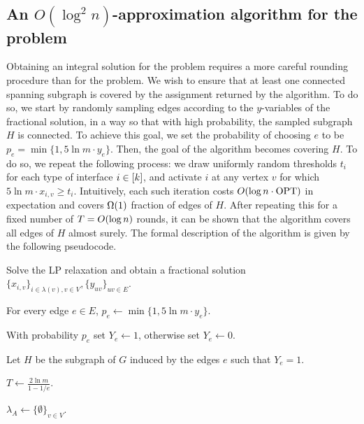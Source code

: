 \subsection{An $O(\log^2 n)$-approximation algorithm for the \connectivity problem}
Obtaining an integral solution for the \connectivity problem requires a more careful rounding procedure than for the \coverage problem. We wish to ensure that at least one connected spanning subgraph is covered by the assignment returned by the algorithm. To do so, we start by randomly sampling edges according to the $y$-variables of the fractional solution, in a way so that with high probability, the sampled subgraph $H$ is connected. To achieve this goal, we set the probability of choosing $e$ to be $p_e=\min\{1, 5\ln m \cdot y_e\}$. Then, the goal of the algorithm becomes covering $H$. To do so, we repeat the following process: we draw uniformly random thresholds $t_i$ for each type of interface $i\in \mathopen{}\left[ k \right]$, and activate $i$ at any vertex $v$ for which $5\ln m \cdot x_{i,v}\geq t_i$. Intuitively, each such iteration costs $O\mathopen{}\left( \log n\cdot \textnormal{OPT} \right)$ in expectation and covers $\Omega\mathopen{}\left( 1 \right)$ fraction of edges of $H$. After repeating this for a fixed number of $T = O\mathopen{}\left( \log n \right)$ rounds, it can be shown that the algorithm covers all edges of $H$ almost surely. The formal description of the algorithm is given by the following pseudocode.

\begin{algorithm}[H]
\caption{$O\br{\log^2n}$-approximation algorithm for the \connectivity problem} \label{alg:3} %

Solve the LP relaxation and obtain a fractional solution $\{x_{i, v}\}_{i\in\lambda(v), v\in V}, \{y_{uv}\}_{uv\in E}$.

For every edge $e\in E$, $p_e \gets \min\{1, 5\ln m \cdot y_e\}$. 

With probability $p_e$ set $Y_e \gets 1$, otherwise set $Y_e \gets 0$. 

Let $H$ be the subgraph of $G$ induced by the edges $e$ such that $Y_e = 1$.

$T \gets \frac{2\ln m}{1-1/e}$.

$\lambda_A\gets \{\emptyset\}_{v\in V}$.

\end{algorithm}

